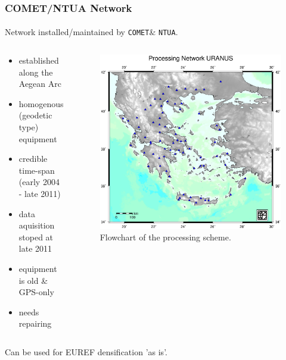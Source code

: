 \documentclass{beamer}
\begin{document}
\begin{frame}\frametitle{COMET/NTUA Network}\framesubtitle{}
  Network installed/maintained by \texttt{COMET}\footnotemark \& \texttt{NTUA}.
\begin{columns}[T] %
\begin{column}{.48\textwidth}
  {\small
  \begin{itemize}
    \setlength\itemsep{.1em}
    \item<pro@1-> established along the Aegean Arc
    \item<pro@1-> homogenous (geodetic type) equipment
    \item<pro@1-> credible time-span (early 2004 - late 2011)
    \item<con@1-> data aquisition stoped at late 2011
    \item<con@1-> equipment is old \& GPS-only
    \item<con@1-> needs repairing
\end{itemize}
}
\end{column}%
\hfill%
\begin{column}{.68\textwidth}
 \begin{figure}
 \begin{center}
 \includegraphics[width=.6\textwidth]{img/uranusnet.eps}
 \caption{Flowchart of the processing scheme.}
 \label{fig:dgrm}
 \end{center}
 \end{figure}
\end{column}%
\end{columns}
  \begin{block}{}
    Can be used for EUREF densification 'as is'.
  \end{block}
\end{frame}
\end{document}
